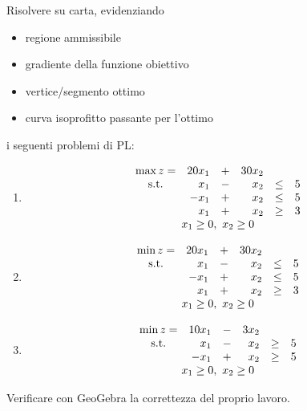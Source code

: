 \documentclass{beamer}
\begin{document}
\generatitolo

\begin{frame}{\esercizi}
Risolvere su carta, evidenziando 
\begin{itemize}
 \item regione ammissibile
 \item gradiente della funzione obiettivo
 \item vertice/segmento ottimo
 \item curva isoprofitto passante per l'ottimo
\end{itemize}
i seguenti problemi di PL:
\end{frame}

\begin{frame}[allowframebreaks]{\esercizi}
\begin{enumerate}
\item
\[\begin{array}{crrrcr}
\max z=& 20 x_1 &+& 30 x_2\\
{\rm s.t.} &  x_1 &-&  x_2 & \leq & 5 \\
           &- x_1 &+&  x_2 & \leq & 5  \\
           &  x_1 &+&  x_2 & \geq & 3  \\
           \multicolumn{6}{c}{x_1 \geq 0,\ x_2 \geq 0}
\end{array}%
\]%

\framebreak

\item
\[\begin{array}{crrrcr}
\min z=& 20 x_1 &+& 30 x_2\\
{\rm s.t.} &  x_1 &-&  x_2 & \leq & 5 \\
           &- x_1 &+&  x_2 & \leq & 5  \\
           &  x_1 &+&  x_2 & \geq & 3  \\
           \multicolumn{6}{c}{x_1 \geq 0,\ x_2 \geq 0}
\end{array}%
\]%


\item
\[\begin{array}{crrrcr}
\min z=& 10 x_1 &-&  3 x_2\\
{\rm s.t.} & x_1 &-&   x_2 & \geq & 5 \\
           &-x_1 &+&   x_2 & \geq & 5 \\
           \multicolumn{6}{c}{x_1 \geq 0,\ x_2 \geq 0}
\end{array}%
\]%
\end{enumerate}

\framebreak

Verificare con GeoGebra la correttezza del proprio lavoro.
\end{frame}
\end{document}
